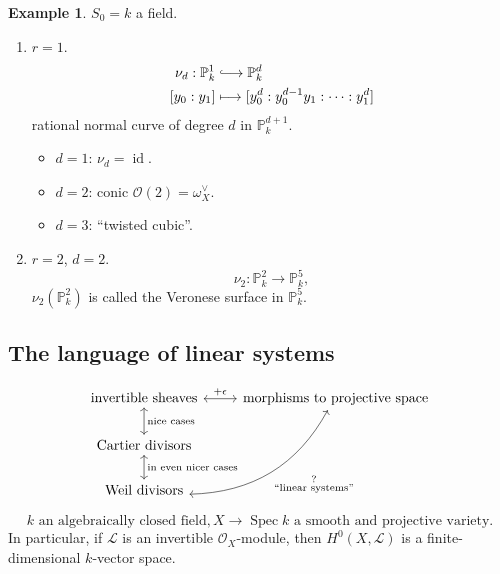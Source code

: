 \documentclass[12pt]{article}
\DeclareMathOperator{\id}{id}
\DeclareMathOperator{\Spec}{Spec}
\theoremstyle{definition}
\newtheorem*{example}{Example}
\theoremstyle{remark}
\begin{document}
\begin{example}
$S_0=k$ a field.

\begin{enumerate}[label=\arabic*)]
\item $r=1$.
\begin{align*}
\nu_d:\mathbb{P}_k^1&\lhook\joinrel\longrightarrow\mathbb{P}_k^d\\
[y_0:y_1]&\longmapsto[y_0^d:y_0^{d-1}y_1:\cdots:y_1^d]
\end{align*}
rational normal curve of degree $d$ in $\mathbb{P}_k^{d+1}$.

\begin{itemize}
\item $d=1$: $\nu_d=\id$.

\item $d=2$: conic $\mathcal{O}(2)=\omega_X^{\vee}$.

\item $d=3$: ``twisted cubic''.
\end{itemize}

\item $r=2$, $d=2$.
\[\nu_2:\mathbb{P}_k^2\longrightarrow\mathbb{P}_k^5,\]
$\nu_2(\mathbb{P}_k^2)$ is called the Veronese surface in $\mathbb{P}_k^5$.
\end{enumerate}
\end{example}

\subsection*{The language of linear systems}
\[
\begin{tikzcd}
\text{invertible sheaves}\arrow[r,<->,"+\epsilon"]\arrow[d,<->,"\text{nice cases}"]&\text{morphisms to projective space}\\
\text{Cartier divisors}\arrow[d,<->,"\text{in even nicer cases}"]\\
\text{Weil divisors}\arrow[ruu,<->,bend right,"\substack{\text{?}\\\text{``linear systems''}}",swap]
\end{tikzcd}
\]

\begin{equation}\tag{$**$}\label{condition_smooth_proj}
k\text{ an algebraically closed field},X\longrightarrow\Spec k\text{ a smooth and projective variety}.
\end{equation}
In particular, if $\mathcal{L}$ is an invertible $\mathcal{O}_X$-module, then $H^0(X,\mathcal{L})$ is a finite-dimensional $k$-vector space.
\end{document}
